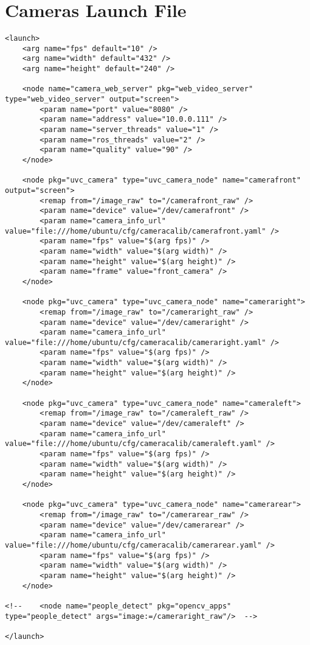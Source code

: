 \section{Cameras Launch File}
\begin{verbatim}
<launch>
	<arg name="fps" default="10" />	
	<arg name="width" default="432" />	
	<arg name="height" default="240" />	

	<node name="camera_web_server" pkg="web_video_server"  type="web_video_server" output="screen">
		<param name="port" value="8080" />
		<param name="address" value="10.0.0.111" />
		<param name="server_threads" value="1" />
		<param name="ros_threads" value="2" />
		<param name="quality" value="90" />
	</node>

	<node pkg="uvc_camera" type="uvc_camera_node" name="camerafront" output="screen">
		<remap from="/image_raw" to="/camerafront_raw" />
		<param name="device" value="/dev/camerafront" />
		<param name="camera_info_url" value="file:///home/ubuntu/cfg/cameracalib/camerafront.yaml" />
		<param name="fps" value="$(arg fps)" />
		<param name="width" value="$(arg width)" />
		<param name="height" value="$(arg height)" />
		<param name="frame" value="front_camera" />
	</node>

	<node pkg="uvc_camera" type="uvc_camera_node" name="cameraright">
		<remap from="/image_raw" to="/cameraright_raw" />
		<param name="device" value="/dev/cameraright" />
		<param name="camera_info_url" value="file:///home/ubuntu/cfg/cameracalib/cameraright.yaml" />
		<param name="fps" value="$(arg fps)" />
		<param name="width" value="$(arg width)" />
		<param name="height" value="$(arg height)" />
	</node>

	<node pkg="uvc_camera" type="uvc_camera_node" name="cameraleft">
		<remap from="/image_raw" to="/cameraleft_raw" />
		<param name="device" value="/dev/cameraleft" />
		<param name="camera_info_url" value="file:///home/ubuntu/cfg/cameracalib/cameraleft.yaml" />
		<param name="fps" value="$(arg fps)" />
		<param name="width" value="$(arg width)" />
		<param name="height" value="$(arg height)" />
	</node>

	<node pkg="uvc_camera" type="uvc_camera_node" name="camerarear">
		<remap from="/image_raw" to="/camerarear_raw" />
		<param name="device" value="/dev/camerarear" />
		<param name="camera_info_url" value="file:///home/ubuntu/cfg/cameracalib/camerarear.yaml" />
		<param name="fps" value="$(arg fps)" />
		<param name="width" value="$(arg width)" />
		<param name="height" value="$(arg height)" />
	</node>

<!--	<node name="people_detect" pkg="opencv_apps" type="people_detect" args="image:=/cameraright_raw"/>  -->

</launch>
\end{verbatim}

